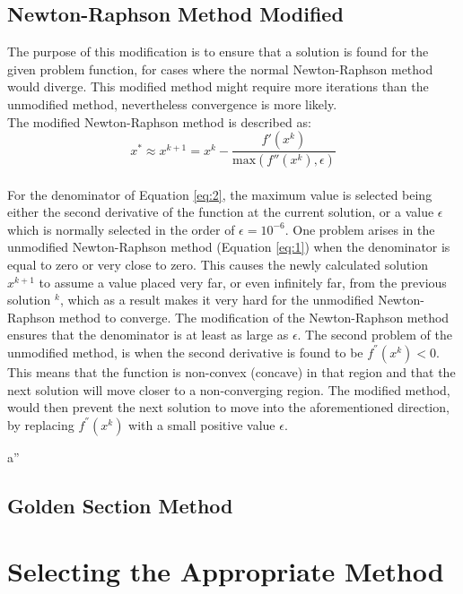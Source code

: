 \documentclass[a4paper,10pt]{article}
\begin{document}
\subsection{Newton-Raphson Method Modified}
The purpose of this modification is to ensure that a solution is found for the given problem function, for cases where the normal Newton-Raphson method would diverge. This modified method might require more iterations than the unmodified method, nevertheless convergence is more likely.
\\[0.5cm]
The modified Newton-Raphson method is described as:
 \begin{equation}\label{eq:2}
  x^{*} \approx x^{k+1} = x^{k} - \frac{f'(x^{k})}{\text{max}(f''(x^{k}),\epsilon)}
 \end{equation}
\\[0.1cm]

For the denominator of Equation \ref{eq:2}, the maximum value is selected being either the second derivative of the function at the current solution, or a value $\epsilon$ which is normally selected in the order of $\epsilon = 10^{-6}$. One problem arises in the unmodified Newton-Raphson method (Equation \ref{eq:1}) when the denominator is equal to zero or very close to zero. This causes the newly calculated solution $x^{k+1}$ to assume a value placed very far, or even infinitely far, from the previous solution $^{k}$, which as a result makes it very hard for the unmodified Newton-Raphson method to converge. The modification of the Newton-Raphson method ensures that the denominator is at least as large as $\epsilon$. The second problem of the unmodified method, is when the second derivative is found to be $f^{''}(x^{k}) < 0$. This means that the function is non-convex (concave) in that region and that the next solution will move closer to a non-converging region. The modified method, would then prevent the next solution to move into the aforementioned direction, by replacing $f^{''}(x^{k})$ with a small positive value $\epsilon$.

a''
\subsection{Golden Section Method}

\section{Selecting the Appropriate Method}
\end{document}
